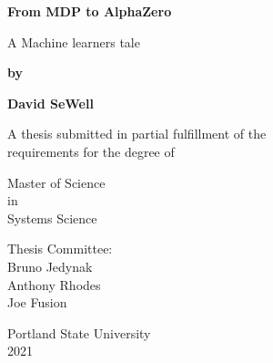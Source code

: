 
\begin{titlepage}
    \begin{center}
       
       \textbf{From MDP to AlphaZero}
    
       \vspace{0.5cm}
        A Machine learners tale
            
       \vspace{2.5cm}
        
       \textbf{by}
       
       \textbf{David SeWell}
        
        \vspace{2.0cm}
        
       A thesis submitted in partial fulfillment of the \\
       requirements for the degree of
       
       \vspace{1.0cm}
       Master of Science\\
       in\\
       Systems Science
       
       \vspace{2.0cm}
        Thesis Committee:\\
        Bruno Jedynak\\
        Anthony Rhodes\\
        Joe Fusion\\
        
       \vspace{2.5cm}
    
       Portland State University\\
       2021
            
    \end{center}
\end{titlepage}
